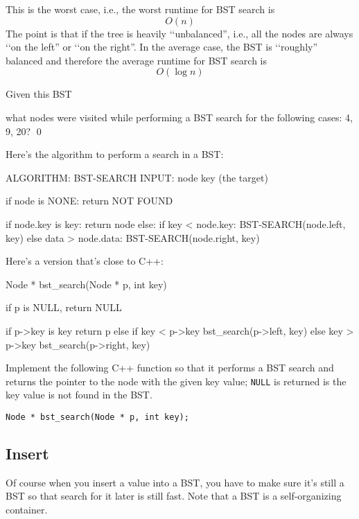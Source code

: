 

This is the worst case, i.e., the worst runtime for BST search is
\[
O(n)
\]
The point is that if the tree is heavily \lq\lq unbalanced'',
i.e., all the nodes are always \lq\lq on the left'' or \lq\lq on the right''.
In the average case,
the BST is \lq\lq roughly'' balanced and therefore
the average runtime for BST search is
\[
O(\log n)
\]


\newpage
\begin{ex}
  
  Given this BST
  
what nodes were visited while performing a BST search for
the following cases: 4, 9, 20?
\qed
\end{ex}


\newpage
Here's the algorithm to perform a search in a BST:
\begin{console}
ALGORITHM: BST-SEARCH
INPUT: node
       key (the target)

if node is NONE:
    return NOT FOUND

if node.key is key:
    return node
else:
    if key < node.key:
        BST-SEARCH(node.left, key)
    else data > node.data:
        BST-SEARCH(node.right, key)
\end{console}

Here's a version that's close to C++:
\begin{console}
Node * bst_search(Node * p, int key)
{
    if p is NULL, return NULL

    if p->key is key
        return p
    else if key < p->key
        bst_search(p->left, key)
    else key > p->key
        bst_search(p->right, key)
}
\end{console}


\newpage
\begin{ex}
Implement the following
C++ function so that it performs a BST search
and returns the pointer to the node with the
given key value; \verb!NULL! is returned is the
key value is not found in the BST.
\begin{Verbatim}[frame=single]
Node * bst_search(Node * p, int key);
\end{Verbatim}
\end{ex}




\newpage
\subsection{Insert}

Of course when you insert a value into a BST, 
you have to make sure it's still a BST so that search for it
later is still fast.
Note that a BST is a self-organizing container.

